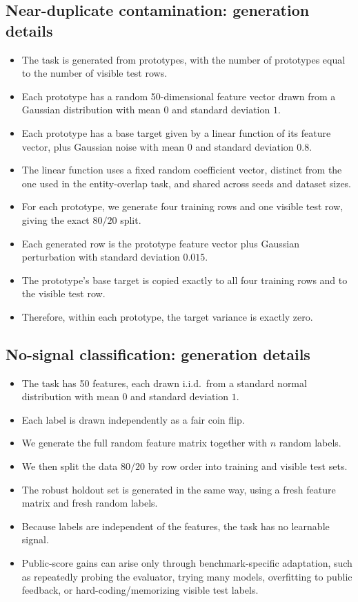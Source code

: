 \documentclass{article} %
\begin{document}
\subsection{Near-duplicate contamination: generation details}
\label{app:near-duplicate-generation}

\begin{itemize}
    \item The task is generated from prototypes, with the number of prototypes equal to the number of visible test rows.
    \item Each prototype has a random 50-dimensional feature vector drawn from a Gaussian distribution with mean $0$ and standard deviation $1$.
    \item Each prototype has a base target given by a linear function of its feature vector, plus Gaussian noise with mean $0$ and standard deviation $0.8$.
    \item The linear function uses a fixed random coefficient vector, distinct from the one used in the entity-overlap task, and shared across seeds and dataset sizes.
    \item For each prototype, we generate four training rows and one visible test row, giving the exact $80/20$ split.
    \item Each generated row is the prototype feature vector plus Gaussian perturbation with standard deviation $0.015$.
    \item The prototype's base target is copied exactly to all four training rows and to the visible test row.
    \item Therefore, within each prototype, the target variance is exactly zero.
\end{itemize}
\subsection{No-signal classification: generation details}
\label{app:public-score-generation}

\begin{itemize}
    \item The task has 50 features, each drawn i.i.d.\ from a standard normal distribution with mean $0$ and standard deviation $1$.
    \item Each label is drawn independently as a fair coin flip.
    \item We generate the full random feature matrix together with $n$ random labels.
    \item We then split the data $80/20$ by row order into training and visible test sets.
    \item The robust holdout set is generated in the same way, using a fresh feature matrix and fresh random labels.
    \item Because labels are independent of the features, the task has no learnable signal.
    \item Public-score gains can arise only through benchmark-specific adaptation, such as repeatedly probing the evaluator, trying many models, overfitting to public feedback, or hard-coding/memorizing visible test labels.
\end{itemize}
\end{document}
